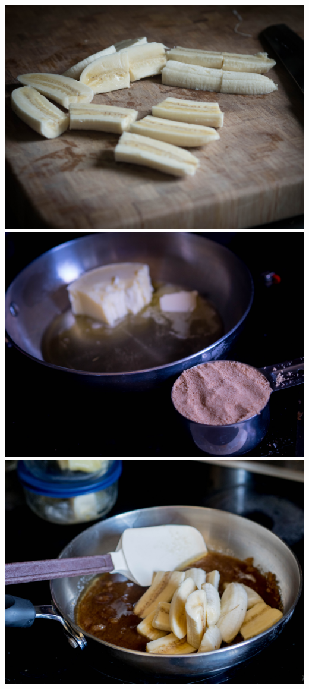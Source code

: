 \newpage
\includegraphics[width=\textwidth]{food/bananas-foster/images/hi-res/03.jpg}
\newpage
\includegraphics[width=\textwidth]{food/bananas-foster/images/hi-res/04.jpg}
\newpage
\includegraphics[width=\textwidth]{food/bananas-foster/images/hi-res/05.jpg}
